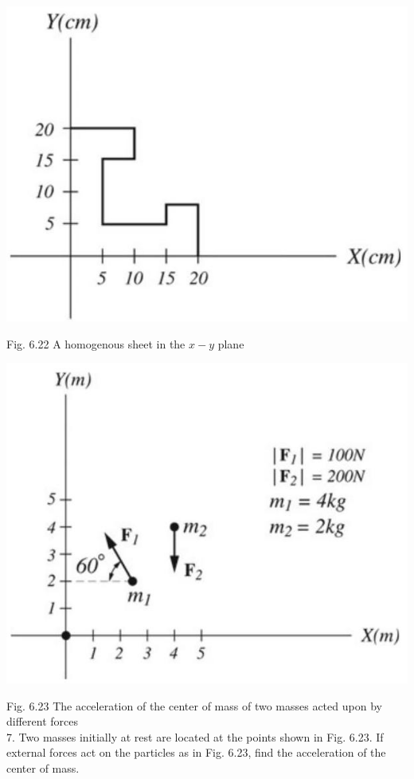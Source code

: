 \documentclass[10pt]{article}
\begin{document}
\begin{center}
\includegraphics[max width=\textwidth]{2024_09_13_db1f357d2aad0a03eb2eg-109(3)}
\end{center}

Fig. 6.22 A homogenous sheet in the $x-y$ plane

\begin{center}
\includegraphics[max width=\textwidth]{2024_09_13_db1f357d2aad0a03eb2eg-109(1)}
\end{center}

Fig. 6.23 The acceleration of the center of mass of two masses acted upon by different forces\\
7. Two masses initially at rest are located at the points shown in Fig. 6.23. If external forces act on the particles as in Fig. 6.23, find the acceleration of the center of mass.
\end{document}
